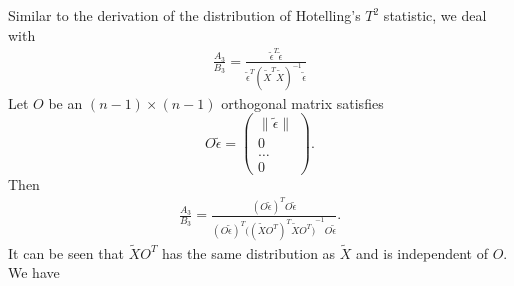 \documentclass[review]{elsarticle}
\theoremstyle{plain}
\theoremstyle{definition}
\theoremstyle{remark}
\begin{document}
Similar to the derivation of the distribution of Hotelling's $T^2$ statistic, we deal with 
\begin{equation*}
    \begin{aligned}
        \frac{A_3}{B_3}=\frac{\tilde{\epsilon}^T\tilde{\epsilon}
    }{\tilde{\epsilon}^T{(\tilde{X}^T\tilde{X})}^{-1}\tilde{\epsilon}
        }
    \end{aligned}
\end{equation*}
Let $O$ be an $(n-1)\times (n-1)$ orthogonal matrix satisfies 
\[
    O\tilde{\epsilon}=
    \begin{pmatrix}
        \|\tilde{\epsilon}\|\\
        0\\
        \ldots\\
        0
    \end{pmatrix}.
    \]
Then
\begin{equation*}
    \begin{aligned}
        \frac{A_3}{B_3}=\frac{{(O\tilde{\epsilon})}^T O\tilde{\epsilon}
        }{{(O\tilde{\epsilon})}^T{\big({(\tilde{X}O^T)}^T\tilde{X}O^T\big)}^{-1} O\tilde{\epsilon}
        }.
    \end{aligned}
\end{equation*}
It can be seen that $\tilde{X}O^T$ has the same distribution as $\tilde{X}$ and is independent of $O$. We have
\end{document}

